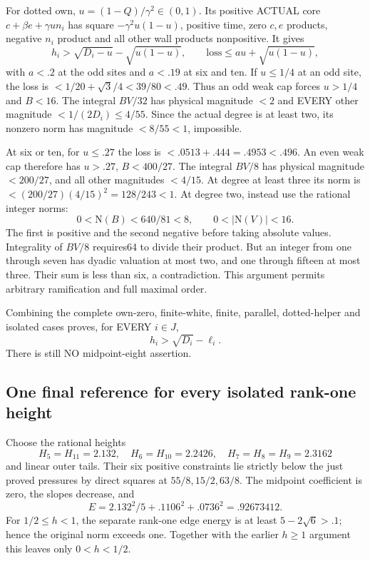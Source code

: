 \documentclass[11pt]{article}
\begin{document}
For dotted own, \(u=(1-Q)/\gamma^2\in(0,1)\).
Its positive ACTUAL core
\(c+\beta e+\gamma u n_i\)
has square \(-\gamma^2u(1-u)\), positive time, zero \(c,e\)
products, negative \(n_i\) product and all other wall products
nonpositive.
It gives
\[
 h_i>\sqrt{D_i-u}-\sqrt{u(1-u)},\qquad
 \text{loss}\le au+\sqrt{u(1-u)} ,
\]
with \(a<.2\) at the odd sites and \(a<.19\) at six and ten.
If \(u\le1/4\) at an odd site, the loss is
\(<1/20+\sqrt3/4<39/80<.49\).
Thus an odd weak cap forces \(u>1/4\) and \(B<16\).
The integral \(BV/32\) has physical magnitude \(<2\) and
EVERY other magnitude \(<1/(2D_i)\le4/55\).
Since the actual degree is at least two, its nonzero norm has
magnitude \(<8/55<1\), impossible.

At six or ten, for \(u\le.27\) the loss is
\(<.0513+.444=.4953<.496\).
An even weak cap therefore has \(u>.27\), \(B<400/27\).
The integral \(BV/8\) has physical magnitude \(<200/27\),
and all other magnitudes \(<4/15\).
At degree at least three its norm is
\(<(200/27)(4/15)^2=128/243<1\).
At degree two, instead use the rational integer norms:
\[
       0<\mathrm N(B)<640/81<8,\qquad
       0<|\mathrm N(V)|<16 .
\]
The first is positive and the second negative before taking
absolute values.
Integrality of \(BV/8\) requires64 to divide their product.
But an integer from one through seven has dyadic valuation
at most two, and one through fifteen at most three.
Their sum is less than six, a contradiction.
This argument permits arbitrary ramification and full maximal order.

Combining the complete own-zero, finite-white, finite, parallel,
dotted-helper and isolated cases proves, for EVERY \(i\in J\),
\[
                            h_i>\sqrt{D_i}-\ell_i .
\]
There is still NO midpoint-eight assertion.

\subsection{One final reference for every isolated rank-one height}
\label{app:arithA15isolatedcomposition}

Choose the rational heights
\[
 H_5=H_{11}=2.132,\quad H_6=H_{10}=2.2426,\quad
 H_7=H_8=H_9=2.3162
\]
and linear outer tails.
Their six positive constraints lie strictly below the just
proved pressures by direct squares at \(55/8,15/2,63/8\).
The midpoint coefficient is zero, the slopes decrease, and
\[
                 E=2.132^2/5+.1106^2+.0736^2=.92673412 .
\]
For \(1/2\le h<1\), the separate rank-one edge energy is
at least \(5-2\sqrt6>.1\); hence the original norm exceeds one.
Together with the earlier \(h\ge1\) argument this leaves
only \(0<h<1/2\).
\end{document}

